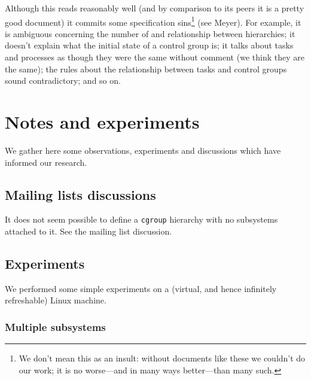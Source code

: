 \documentclass[a4paper,twoside,12pt]{article}
\begin{document}
Although this reads reasonably well (and by comparison to its peers it is a pretty good document) it commits some
specification sins\footnote{We don't mean this as an insult: without documents like these we couldn't do our work;
it is no worse---and in many ways better---than many such.} (see Meyer\cite{7sins}).
For example, it is ambiguous concerning the number of and relationship between hierarchies; it
doesn't explain what the initial state of a control group is; it talks about tasks and processes as though they were the same without comment (we think they are the same);
the rules about the relationship between tasks and control groups sound contradictory; and so on.


\section{Notes and experiments}
\label{sec:notes}

We gather here some observations, experiments and discussions which have informed our research.

\subsection{Mailing lists discussions}

It does not seem possible to define a \texttt{cgroup} hierarchy with no subsystems attached to it.
See the mailing list discussion\cite{noop}.

\subsection{Experiments}
\label{sec:experiments}
We performed some simple experiments on a (virtual, and hence infinitely refreshable) Linux machine.

\subsubsection{Multiple subsystems}
\end{document}
